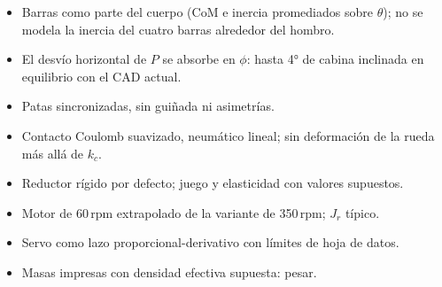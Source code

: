 \documentclass[11pt,a4paper]{article}
\begin{document}
\begin{itemize}\itemsep2pt
  \item Barras como parte del cuerpo (CoM e inercia promediados sobre $\theta$); no se modela la inercia del
  cuatro barras alrededor del hombro.
  \item El desvío horizontal de $P$ se absorbe en $\phi$: hasta 4° de cabina inclinada en equilibrio con el CAD actual.
  \item Patas sincronizadas, sin guiñada ni asimetrías.
  \item Contacto Coulomb suavizado, neumático lineal; sin deformación de la rueda más allá de $k_c$.
  \item Reductor rígido por defecto; juego y elasticidad con valores supuestos.
  \item Motor de 60\,rpm extrapolado de la variante de 350\,rpm; $J_r$ típico.
  \item Servo como lazo proporcional-derivativo con límites de hoja de datos.
  \item Masas impresas con densidad efectiva supuesta: pesar.
\end{itemize}
\end{document}
